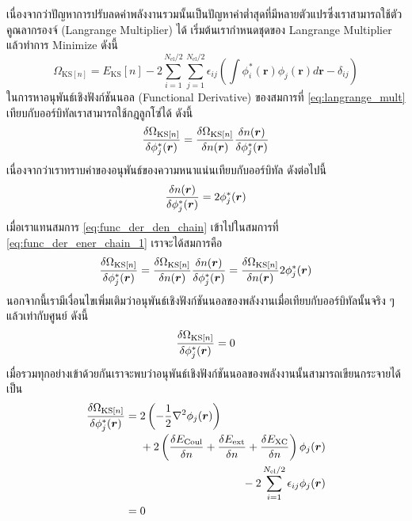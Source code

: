 เนื่องจากว่าปัญหาการปรับลดค่าพลังงานรวมนั้นเป็นปัญหาค่าต่ำสุดที่มีหลายตัวแปรซึ่งเราสามารถใช้ตัวคูณลากรองจ์ (Langrange Multiplier) ได้ เริ่มต้นเรากำหนดชุดของ Langrange Multiplier แล้วทำการ Minimize ดังนี้
%
\begin{equation}\label{eq:langrange_mult}
    \Omega_{\text{KS}[n]} = E_{\text{KS}}[n] - 2 \sum^{N_{\text{el}}/2}_{i=1} \sum^{N_{\text{el}}/2}_{j=1}
    \epsilon_{ij} \left ( \int \phi^{\ast}_{i}(\bm{r}) \phi_{j}(\bm{r}) d\bm{r} - \delta_{ij} \right )
\end{equation}
%
\noindent ในการหาอนุพันธ์เชิงฟังก์ชันนอล (Functional Derivative) ของสมการที่ \eqref{eq:langrange_mult} เทียบกับออร์บิทัลเราสามารถใช้กฎลูกโซ่ได้ ดังนี้
%
\begin{equation}\label{eq:func_der_ener_chain_1}
    \fdv{\Omega_{\text{KS}[n]}}{\phi^{\ast}_{j}(\bm{r})} = \fdv{\Omega_{\text{KS}[n]}}{n(\bm{r})}
    \fdv{n(\bm{r})}{\phi^{\ast}_{j}(\bm{r})}
\end{equation}
%
\noindent เนื่องจากว่าเราทราบค่าของอนุพันธ์ของความหนาแน่นเทียบกับออร์บิทัล ดังต่อไปนี้
%
\begin{equation}\label{eq:func_der_den_chain}
    \fdv{n(\bm{r})}{\phi^{\ast}_{j}(\bm{r})} = 2 \phi^{\ast}_{j}(\bm{r})
\end{equation}
%
\noindent เมื่อเราแทนสมการ \eqref{eq:func_der_den_chain} เข้าไปในสมการที่ \eqref{eq:func_der_ener_chain_1} เราจะได้สมการคือ
%
\begin{equation}\label{eq:func_der_ener_chain_2}
    \fdv{\Omega_{\text{KS}[n]}}{\phi^{\ast}_{j}(\bm{r})} = \fdv{\Omega_{\text{KS}[n]}}{n(\bm{r})}
    \fdv{n(\bm{r})}{\phi^{\ast}_{j}(\bm{r})} = \fdv{\Omega_{\text{KS}[n]}}{n(\bm{r})} 2 \phi^{\ast}_{j}(\bm{r})
\end{equation}
%
\noindent นอกจากนี้เรามีเงื่อนไขเพิ่มเติมว่าอนุพันธ์เชิงฟังก์ชันนอลของพลังงานเมื่อเทียบกับออร์บิทัลนั้นจริง ๆ แล้วเท่ากับศูนย์ ดังนี้
%
\begin{equation}\label{eq:func_der_ener_chain_zero}
    \fdv{\Omega_{\text{KS}[n]}}{\phi^{\ast}_{j}(\bm{r})} = 0
\end{equation}
%
เมื่อรวมทุกอย่างเข้าด้วยกันเราจะพบว่าอนุพันธ์เชิงฟังก์ชันนอลของพลังงานนั้นสามารถเขียนกระจายได้เป็น
%
\begin{align}
    \fdv{\Omega_{\text{KS}[n]}}{\phi^{\ast}_{j}(\bm{r})}
     & = \begin{multlined}[t]
             2 \left ( -\frac{1}{2}\nabla^{2} \phi_{j}(\bm{r}) \right ) \\
             + 2 \left ( \fdv{E_{\text{Coul}}}{n} + \fdv{E_{\text{ext}}}{n} + \fdv{E_{\text{XC}}}{n} \right )
             \phi_{j}(\bm{r}) \\
             - 2 \sum^{N_{\text{el}}/2}_{i=1} \epsilon_{ij} \phi_{j}(\bm{r})
         \end{multlined} \\
     & = 0
\end{align}
